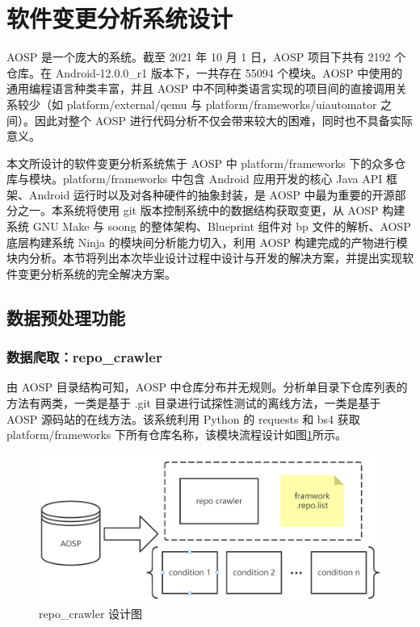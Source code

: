 \section{软件变更分析系统设计}\label{system-design}

AOSP 是一个庞大的系统。截至 2021 年 10 月 1 日，AOSP 项目下共有 2192 个仓库。在 Android-12.0.0\_r1 版本下，一共存在 55094 个模块。AOSP 中使用的通用编程语言种类丰富，并且 AOSP 中不同种类语言实现的项目间的直接调用关系较少（如 platform/external/qemu 与 platform/frameworks/uiautomator 之间）。因此对整个 AOSP 进行代码分析不仅会带来较大的困难，同时也不具备实际意义。

本文所设计的软件变更分析系统焦于 AOSP 中 platform/frameworks 下的众多仓库与模块。platform/frameworks 中包含 Android 应用开发的核心 Java API 框架、Android 运行时以及对各种硬件的抽象封装，是 AOSP 中最为重要的开源部分之一。本系统将使用 git 版本控制系统中的数据结构获取变更，从 AOSP 构建系统 GNU Make 与 soong 的整体架构、Blueprint 组件对 bp 文件的解析、AOSP 底层构建系统 Ninja 的模块间分析能力切入，利用 AOSP 构建完成的产物进行模块内分析。本节将列出本次毕业设计过程中设计与开发的解决方案，并提出实现软件变更分析系统的完全解决方案。

\subsection{数据预处理功能}

\subsubsection{数据爬取：repo\_crawler}

由 AOSP 目录结构可知，AOSP 中仓库分布并无规则。分析单目录下仓库列表的方法有两类，一类是基于 .git 目录进行试探性测试的离线方法，一类是基于 AOSP 源码站的在线方法。该系统利用 Python 的 requests 和 bs4 获取 platform/frameworks 下所有仓库名称，该模块流程设计如图\ref{fig:archi-repo-crawler}所示。

\begin{figure}
    \centering
    \includegraphics[width=.8\textwidth]{figures/archi-repo-crawler.png}
    \caption{repo\_crawler 设计图}
    \label{fig:archi-repo-crawler}
\end{figure}

